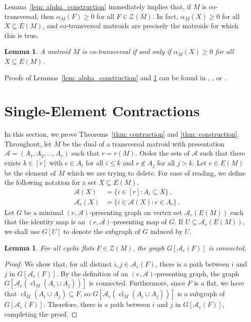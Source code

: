 \documentclass[11pt, reqno]{amsart}
\newtheorem{lemma}[theorem]{Lemma}
\DeclareMathOperator{\cl}{cl}
\begin{document}
Lemma~\ref{lem: alpha_construction} immediately implies that, if $M$ is co-transversal, then $\alpha_M(F) \geq 0$ for all $F \in \mathcal Z(M)$. In fact, $\alpha_M(X) \geq 0$ for all $X \subseteq E(M)$, and co-transversal matroids are precisely the matroids for which this is true.

\begin{lemma} \label{lem: alpha}
A matroid $M$ is co-transversal if and only if $\alpha_M\left(X\right) \geq 0$ for all $X \subseteq E(M)$.
\end{lemma}

Proofs of Lemmas~\ref{lem: alpha_construction} and \ref{lem: alpha} can be found in \cite{ing73}, \cite{kun78}, or \cite{bon15}.
	
\section{Single-Element Contractions} \label{contractions}

In this section, we prove Theorems~\ref{thm: contraction} and \ref{thm: construction}. Throughout, let $M$ be the dual of a transversal matroid with presentation $\mathcal A = (A_1, A_2, \ldots, A_r)$ such that $r = r(M)$. Order the sets of $\mathcal A$ such that there exists $k \in [r]$ with $e \in A_i$ for all $i \leq k$ and $e \notin A_j$ for all $j > k$. Let $e \in E(M)$ be the element of $M$ which we are trying to delete. For ease of reading, we define the following notation for a set $X \subseteq E(M)$.
\begin{align*}
\mathcal A(X) &= \{i \in [r] : A_i \subseteq X\} \,, \\
\mathcal A_e(X) &= \{i \in \mathcal A(X) : e \in A_i\} \,.
\end{align*}
Let $G$ be a minimal $(e, \mathcal A)$-presenting graph on vertex set $\mathcal A_e(E(M))$ such that the identity map is an $(e, \mathcal A)$-presenting map of $G$. If $U \subseteq \mathcal A_e(E(M))$, we shall use $G[U]$ to denote the subgraph of $G$ induced by $U$.

\begin{lemma} \label{lem: flat connected}
For all cyclic flats $F \in \mathcal Z(M)$, the graph $G[\mathcal A_e(F)]$ is connected.	
\end{lemma}

\begin{proof}
We show that, for all distinct $i, j \in \mathcal A_e(F)$, there is a path between $i$ and $j$ in $G[\mathcal A_e(F)]$. By the definition of an $(e, \mathcal A)$-presenting graph, the graph $G[\mathcal A_e(\cl_M(A_i \cup A_j))]$ is connected. Furthermore, since $F$ is a flat, we have that $\cl_M(A_i \cup A_j) \subseteq F$, so 
$G[\mathcal A_e(\cl_M(A_i \cup A_j))]$ is a subgraph of $G[\mathcal A_e(F)]$. Therefore, there is a path between $i$ and $j$ in $G[\mathcal A_e(F)]$, completing the proof.
\end{proof}
\end{document}
